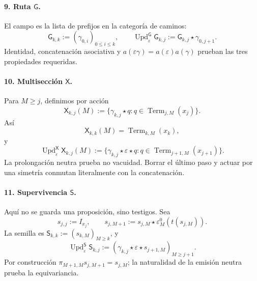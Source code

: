 \paragraph{9. Ruta \(\mathsf G\).}
El campo es la lista de prefijos en la categoría de caminos:
\begin{equation}
\label{eq:pdfv2-terminal-update-g}
 \mathsf G_{k,k}:=(\gamma_{0,i})_{0\leq i\leq k},\qquad
 \operatorname{Upd}^{\mathsf G}_{\varepsilon}\mathsf G_{k,j}
 :=\mathsf G_{k,j}\star\gamma_{0,j+1}.
\end{equation}
Identidad, concatenación asociativa y
\(a(\varepsilon\gamma)=a(\varepsilon)a(\gamma)\) prueban las tres
propiedades requeridas.

\paragraph{10. Multisección \(\mathsf X\).}
Para \(M\geq j\), definimos por acción
\begin{equation}
\label{eq:pdfv2-terminal-multiseccion-interna}
 \mathsf X_{k,j}(M):=
 \{\gamma_{k,j}\star q:
 q\in\operatorname{Term}_{j,M}(x_j)\}.
\end{equation}
Así
\[
 \mathsf X_{k,k}(M)=\operatorname{Term}_{k,M}(x_k),
\]
y
\begin{equation}
\label{eq:pdfv2-terminal-update-x}
 \operatorname{Upd}^{\mathsf X}_{\varepsilon}\mathsf X_{k,j}(M)
 :=
 \{\gamma_{k,j}\star\varepsilon\star q:
 q\in\operatorname{Term}_{j+1,M}(x_{j+1})\}.
\end{equation}
La prolongación neutra prueba no vacuidad. Borrar el último paso y actuar
por una simetría conmutan literalmente con la concatenación.

\paragraph{11. Supervivencia \(\mathsf S\).}
Aquí no se guarda una proposición, sino testigos. Sea
\begin{equation}
\label{eq:pdfv2-terminal-testigo-neutro}
 s_{j,j}:=I_{x_j},\qquad
 s_{j,M+1}:=s_{j,M}\star
 \varepsilon_M^0(t(s_{j,M})).
\end{equation}
La semilla es
\(\mathsf S_{k,k}:=(s_{k,M})_{M\geq k}\), y
\begin{equation}
\label{eq:pdfv2-terminal-update-s}
 \operatorname{Upd}^{\mathsf S}_{\varepsilon}\mathsf S_{k,j}
 :=(\gamma_{k,j}\star\varepsilon\star s_{j+1,M})_{M\geq j+1}.
\end{equation}
Por construcción
\(\pi_{M+1,M}s_{j,M+1}=s_{j,M}\); la naturalidad de la emisión neutra
prueba la equivariancia.

